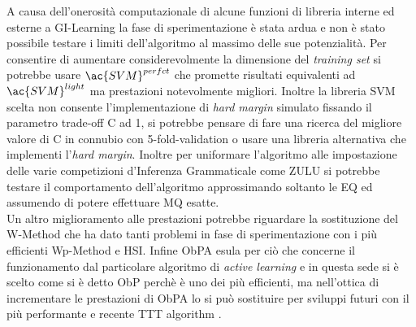 A causa dell'onerosità computazionale di alcune funzioni di libreria interne ed esterne a GI-Learning la fase di sperimentazione è stata ardua e non è stato possibile testare i limiti dell'algoritmo al massimo delle sue potenzialità. Per consentire di aumentare considerevolmente la dimensione del \textit{training set}  si potrebbe usare $\ac{SVM}^{perfct}$ che promette risultati equivalenti ad $\ac{SVM}^{light}$ ma prestazioni notevolmente migliori. Inoltre la libreria \ac{SVM} scelta non consente l'implementazione di \textit{hard margin}  simulato fissando il parametro trade-off C ad 1, si potrebbe pensare di fare una ricerca del migliore valore di C in connubio con 5-fold-validation o usare una libreria alternativa che implementi l'\textit{hard margin}.  Inoltre per uniformare l'algoritmo alle impostazione delle varie competizioni d'Inferenza Grammaticale come ZULU si potrebbe testare il comportamento dell'algoritmo approssimando soltanto le \ac{EQ} ed assumendo di potere effettuare \ac{MQ} esatte.\\
Un altro miglioramento alle prestazioni  potrebbe riguardare la sostituzione del W-Method che ha dato tanti problemi in fase di sperimentazione con i più efficienti Wp-Method e HSI.
 Infine \ac{ObPA} esula per ciò che concerne il funzionamento dal particolare algoritmo di \textit{active learning} e in questa sede si è scelto come si è detto \ac{ObP} perchè è uno dei più efficienti, ma nell'ottica di incrementare le prestazioni di \ac{ObPA} lo si può sostituire per sviluppi futuri con il più performante e recente  TTT algorithm \cite{SteffenTTT14}. 

